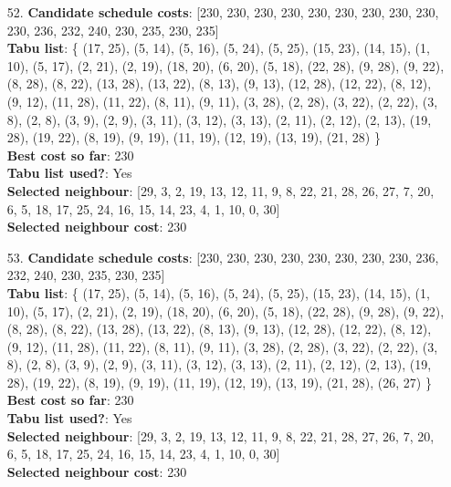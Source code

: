 \documentclass[fleqn]{article}
\begin{document}
\begin{itemize}
    \item[52.] \textbf{Candidate schedule costs}: [230, 230, 230, 230, 230, 230, 230, 230, 230, 230, 236, 232, 240, 230, 235, 230, 235] \\
    \textbf{Tabu list}: \{ (17, 25), (5, 14), (5, 16), (5, 24), (5, 25), (15, 23), (14, 15), (1, 10), (5, 17), (2, 21), (2, 19), (18, 20), (6, 20), (5, 18), (22, 28), (9, 28), (9, 22), (8, 28), (8, 22), (13, 28), (13, 22), (8, 13), (9, 13), (12, 28), (12, 22), (8, 12), (9, 12), (11, 28), (11, 22), (8, 11), (9, 11), (3, 28), (2, 28), (3, 22), (2, 22), (3, 8), (2, 8), (3, 9), (2, 9), (3, 11), (3, 12), (3, 13), (2, 11), (2, 12), (2, 13), (19, 28), (19, 22), (8, 19), (9, 19), (11, 19), (12, 19), (13, 19), (21, 28) \} \\
    \textbf{Best cost so far}: 230 \\
    \textbf{Tabu list used?}: Yes \\
    \textbf{Selected neighbour}: [29, 3, 2, 19, 13, 12, 11, 9, 8, 22, 21, 28, 26, 27, 7, 20, 6, 5, 18, 17, 25, 24, 16, 15, 14, 23, 4, 1, 10, 0, 30] \\
    \textbf{Selected neighbour cost}: 230
      

    \item[53.] \textbf{Candidate schedule costs}: [230, 230, 230, 230, 230, 230, 230, 230, 236, 232, 240, 230, 235, 230, 235] \\
    \textbf{Tabu list}: \{ (17, 25), (5, 14), (5, 16), (5, 24), (5, 25), (15, 23), (14, 15), (1, 10), (5, 17), (2, 21), (2, 19), (18, 20), (6, 20), (5, 18), (22, 28), (9, 28), (9, 22), (8, 28), (8, 22), (13, 28), (13, 22), (8, 13), (9, 13), (12, 28), (12, 22), (8, 12), (9, 12), (11, 28), (11, 22), (8, 11), (9, 11), (3, 28), (2, 28), (3, 22), (2, 22), (3, 8), (2, 8), (3, 9), (2, 9), (3, 11), (3, 12), (3, 13), (2, 11), (2, 12), (2, 13), (19, 28), (19, 22), (8, 19), (9, 19), (11, 19), (12, 19), (13, 19), (21, 28), (26, 27) \} \\
    \textbf{Best cost so far}: 230 \\
    \textbf{Tabu list used?}: Yes \\
    \textbf{Selected neighbour}: [29, 3, 2, 19, 13, 12, 11, 9, 8, 22, 21, 28, 27, 26, 7, 20, 6, 5, 18, 17, 25, 24, 16, 15, 14, 23, 4, 1, 10, 0, 30] \\
    \textbf{Selected neighbour cost}: 230
      


\end{itemize}
\end{document}
